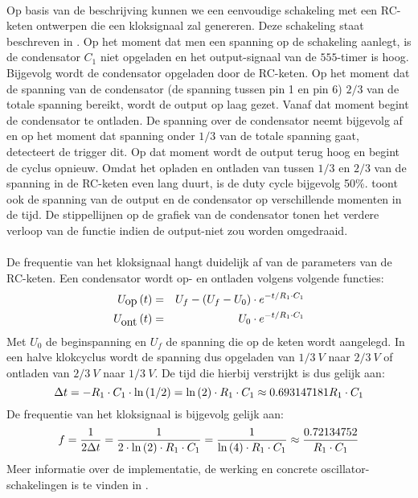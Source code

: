 \paragraph{}
Op basis van de beschrijving kunnen we een eenvoudige schakeling met een RC-keten ontwerpen die een kloksignaal zal genereren. Deze schakeling staat beschreven in . Op het moment dat men een spanning op de schakeling aanlegt, is de condensator $C_1$ niet opgeladen en het \mbox{output}-signaal van de $555$-timer is hoog. Bijgevolg wordt de condensator opgeladen door de RC-keten. Op het moment dat de spanning van de condensator (de spanning tussen pin 1 en pin 6) $2/3$ van de totale spanning bereikt, wordt de \mbox{output} op laag gezet. Vanaf dat moment begint de condensator te ontladen. De spanning over de condensator neemt bijgevolg af en op het moment dat spanning onder $1/3$ van de totale spanning gaat, detecteert de \mbox{trigger} dit. Op dat moment wordt de \mbox{output} terug hoog en begint de cyclus opnieuw. Omdat het opladen en ontladen van tussen $1/3$ en $2/3$ van de spanning in de RC-keten even lang duurt, is de duty cycle bijgevolg 50\%.  toont ook de spanning van de \mbox{output} en de condensator op verschillende momenten in de tijd. De stippellijnen op de grafiek van de condensator tonen het verdere verloop van de functie indien de \mbox{output}-niet zou worden omgedraaid.
\paragraph{}
De frequentie van het kloksignaal hangt duidelijk af van de parameters van de RC-keten. Een condensator wordt op- en ontladen volgens volgende functies:
\begin{eqnarray}
U_{\mbox{op}}\left( t \right)&=&U_f-\left( U_f-U_0 \right)\cdot e^{-t/R_1\cdot C_1}\\
U_{\mbox{ont}}\left( t \right)&=&U_0\cdot e^{-t/R_1\cdot C_1}
\end{eqnarray}
Met $U_0$ de beginspanning en $U_f$ de spanning die op de keten wordt aangelegd. In een halve klokcyclus wordt de spanning dus opgeladen van $1/3\ V$ naar $2/3\ V$ of ontladen van $2/3\ V$ naar $1/3\ V$. De tijd die hierbij verstrijkt is dus gelijk aan:
\begin{equation}
\Delta t=-R_1\cdot C_1\cdot\ln\left( 1/2 \right)=\ln\left( 2 \right)\cdot R_1\cdot C_1\approx 0.693147181 R_1\cdot C_1
\end{equation}
De frequentie van het kloksignaal is bijgevolg gelijk aan:
\begin{equation}
f=\displaystyle\frac{1}{2\Delta t}=\displaystyle\frac{1}{2\cdot\ln\left( 2 \right)\cdot R_1\cdot C_1}=\displaystyle\frac{1}{\ln\left( 4 \right)\cdot R_1\cdot C_1}\approx\displaystyle\frac{0.72134752}{R_1\cdot C_1}
\end{equation}
Meer informatie over de implementatie, de werking en concrete oscillator-schakelingen is te vinden in \cite{ne555}.
